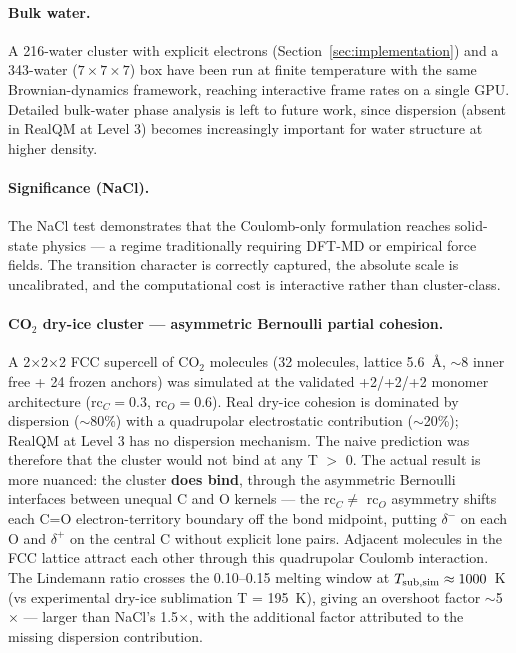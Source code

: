 \documentclass[11pt]{article}
\begin{document}
\paragraph{Bulk water.}
A 216-water cluster with explicit electrons (Section~\ref{sec:implementation}) and a 343-water ($7 \times 7 \times 7$) box have been run at finite temperature with the same Brownian-dynamics framework, reaching interactive frame rates on a single GPU. Detailed bulk-water phase analysis is left to future work, since dispersion (absent in RealQM at Level 3) becomes increasingly important for water structure at higher density.

\paragraph{Significance (NaCl).}
The NaCl test demonstrates that the Coulomb-only formulation reaches solid-state physics --- a regime traditionally requiring DFT-MD or empirical force fields. The transition character is correctly captured, the absolute scale is uncalibrated, and the computational cost is interactive rather than cluster-class.

\paragraph{CO$_2$ dry-ice cluster --- asymmetric Bernoulli partial cohesion.}
A 2$\times$2$\times$2 FCC supercell of CO$_2$ molecules (32 molecules, lattice 5.6~\AA, $\sim$8 inner free + 24 frozen anchors) was simulated at the validated +2/+2/+2 monomer architecture (rc$_C = 0.3$, rc$_O = 0.6$). Real dry-ice cohesion is dominated by dispersion ($\sim$80\%) with a quadrupolar electrostatic contribution ($\sim$20\%); RealQM at Level 3 has no dispersion mechanism. The naive prediction was therefore that the cluster would not bind at any T $>$ 0. The actual result is more nuanced: the cluster \textbf{does bind}, through the asymmetric Bernoulli interfaces between unequal C and O kernels --- the rc$_C \neq$ rc$_O$ asymmetry shifts each C=O electron-territory boundary off the bond midpoint, putting $\delta^-$ on each O and $\delta^+$ on the central C without explicit lone pairs. Adjacent molecules in the FCC lattice attract each other through this quadrupolar Coulomb interaction. The Lindemann ratio crosses the 0.10--0.15 melting window at $T_{\rm sub,sim} \approx 1000$~K (vs experimental dry-ice sublimation T = 195~K), giving an overshoot factor $\sim$5$\times$ --- larger than NaCl's 1.5$\times$, with the additional factor attributed to the missing dispersion contribution.
\end{document}
